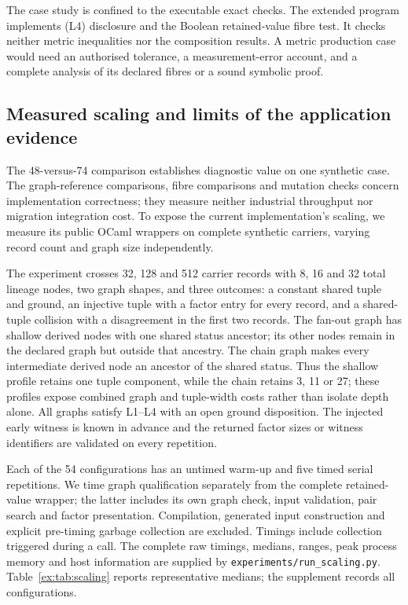 \documentclass[twocolumn,envcountsect,envcountsame,natbib]{svjour3}
\begin{document}
The case study is confined to the executable exact checks. The extended program implements (L4) disclosure and the Boolean retained-value fibre test. It checks neither metric inequalities nor the composition results. A metric production case would need an authorised tolerance, a measurement-error account, and a complete analysis of its declared fibres or a sound symbolic proof.

\subsection{Measured scaling and limits of the application evidence}\label{ex:sec:scaling}
The 48-versus-74 comparison establishes diagnostic value on one synthetic case. The graph-reference comparisons, fibre comparisons and mutation checks concern implementation correctness; they measure neither industrial throughput nor migration integration cost. To expose the current implementation's scaling, we measure its public OCaml wrappers on complete synthetic carriers, varying record count and graph size independently.

The experiment crosses 32, 128 and 512 carrier records with 8, 16 and 32 total lineage nodes, two graph shapes, and three outcomes: a constant shared tuple and ground, an injective tuple with a factor entry for every record, and a shared-tuple collision with a disagreement in the first two records. The fan-out graph has shallow derived nodes with one shared status ancestor; its other nodes remain in the declared graph but outside that ancestry. The chain graph makes every intermediate derived node an ancestor of the shared status. Thus the shallow profile retains one tuple component, while the chain retains 3, 11 or 27; these profiles expose combined graph and tuple-width costs rather than isolate depth alone. All graphs satisfy L1--L4 with an open ground disposition. The injected early witness is known in advance and the returned factor sizes or witness identifiers are validated on every repetition.

Each of the 54 configurations has an untimed warm-up and five timed serial repetitions. We time graph qualification separately from the complete retained-value wrapper; the latter includes its own graph check, input validation, pair search and factor presentation. Compilation, generated input construction and explicit pre-timing garbage collection are excluded. Timings include collection triggered during a call. The complete raw timings, medians, ranges, peak process memory and host information are supplied by \nolinkurl{experiments/run_scaling.py}. Table~\ref{ex:tab:scaling} reports representative medians; the supplement records all configurations.
\end{document}
